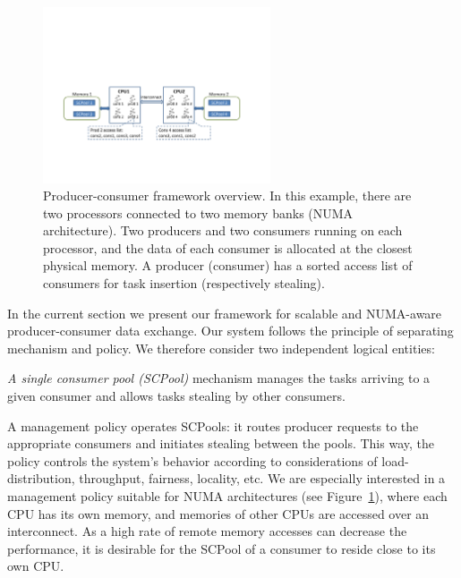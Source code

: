 \begin{figure}[tbh]
	\centering
	\includegraphics[width=0.6\textwidth]{figures/system-fig}
	\caption{\footnotesize{Producer-consumer framework overview. In this example, there are two processors connected to two memory banks (NUMA architecture). Two producers and two consumers running on each processor, and the data of each consumer is allocated at the closest physical memory. A producer (consumer) has a sorted access list of consumers for task insertion (respectively stealing). }}
	\vspace{-10pt}
	\label{fig:system-fig}
\end{figure}

In the current section we present our framework for scalable and NUMA-aware producer-consumer data exchange. 
Our system follows the principle of separating mechanism and policy.
We therefore consider two independent logical entities: 

\begin{enum*}
	\item \emph{A single consumer pool (SCPool)} mechanism manages the tasks arriving to a given consumer and allows tasks stealing by other consumers.
	\item A management policy operates SCPools: it routes producer requests to the appropriate consumers and initiates stealing between the pools. This way, the policy controls the system's behavior according to considerations of load-distribution, throughput, fairness, locality, etc.
	We are especially interested in a management policy suitable for NUMA architectures (see Figure~\ref{fig:system-fig}), where each CPU has its own memory, and memories of other CPUs are accessed over an interconnect. As a high rate of remote memory accesses can decrease the performance, it is desirable for the SCPool of a consumer to reside close to its own CPU. 
\end{enum*} 

